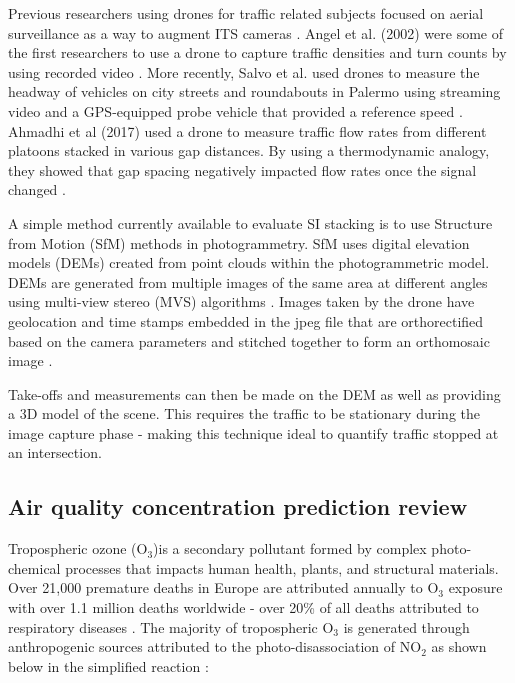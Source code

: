 Previous researchers using drones for traffic related subjects focused on aerial surveillance as a way to augment ITS cameras \citep{Liu2013, Barmpounakis2016}. Angel et al. (2002) were some of the first researchers to use a drone to capture traffic densities and turn counts by using recorded video \citep{Angel2002}. More recently, Salvo et al. used drones to measure the headway of vehicles on city streets and roundabouts in Palermo using streaming video and a GPS-equipped probe vehicle that provided a reference speed \citep{Salvo2014, Salvo2017}. Ahmadhi et al (2017) used a drone to measure traffic flow rates from different platoons stacked in various gap distances. By using a thermodynamic analogy, they showed that gap spacing negatively impacted flow rates once the signal changed \citep{Ahmadi2017}.

A simple method currently available to evaluate SI stacking is to use Structure from Motion (SfM) methods in photogrammetry. SfM uses digital elevation models (DEMs) created from point clouds within the photogrammetric model. DEMs are generated from multiple images of the same area at different angles using multi-view stereo (MVS) algorithms \citep{James2017}. Images taken by the drone have geolocation and time stamps embedded in the jpeg file that are orthorectified based on the camera parameters and stitched together to form an orthomosaic image \citep{Westoby2012}.

Take-offs and measurements can then be made on the DEM as well as providing a 3D model of the scene. This requires the traffic to be stationary during the image capture phase - making this technique ideal to quantify traffic stopped at an intersection.


\clearpage
\subsection{Air quality concentration prediction review}

Tropospheric ozone (O$_{3}$)is a secondary pollutant formed by complex photo-chemical processes that impacts human health, plants, and structural materials. Over 21,000 premature deaths in Europe are attributed annually to O$_{3}$ exposure \citep{WHO2008} with over 1.1 million deaths worldwide - over 20\% of all deaths attributed to respiratory diseases \citep{Malley2017}. The majority of tropospheric O$_{3}$ is generated through anthropogenic sources \citep{Lelieveld2000, Cooper2006} attributed to the photo-disassociation of NO$_{2}$ as shown below in the simplified reaction \citep{Finlayson1993}:

